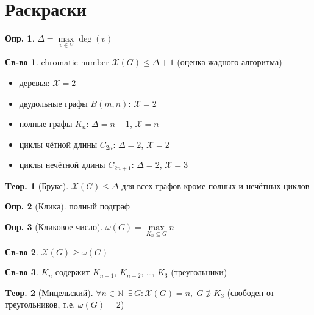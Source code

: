 \documentclass[a4paper,12pt]{article}
\theoremstyle{definition}
\newtheorem{definition}{Опр.}[section]
\newtheorem*{property}{Св-во}  %
\theoremstyle{definition}
\newtheorem{theorem}{Tеор.}[section]
\def\iiChi{\mathcal{X}}
\begin{document}
\section{Раскраски}

\begin{definition} $\Delta = \max \limits_{v \in V} \deg(v)$ \end{definition}

\begin{property}
	chromatic number $\iiChi(G) \leqslant \Delta + 1$ (оценка жадного алгоритма)
\end{property}

\begin{itemize}
  \item  деревья:  $\iiChi=2$
  \item  двудольные графы $B(m,n)$: $\iiChi=2$
  \item  полные графы $K_n$:        $\Delta=n-1$, $\iiChi=n$
  \item  циклы чётной длины $C_{2n}$:     $\Delta=2$, $\iiChi=2$
  \item  циклы нечётной длины $C_{2n+1}$: $\Delta=2$, $\iiChi=3$
\end{itemize}

\begin{theorem}[Брукс]
	$\iiChi(G) \leqslant \Delta$ для всех графов кроме полных и нечётных циклов
\end{theorem}

\begin{definition}[Клика] полный подграф \end{definition}

\begin{definition}[Кликовое число]
	$ \omega(G) = \max \limits_{K_n \subseteq G} n $
\end{definition}

\begin{property} $ \iiChi(G) \geqslant \omega(G) $ \end{property}

\begin{property} $K_n$ содержит $K_{n-1}$, $K_{n-2}$, \dots, $K_3$ (треугольники) \end{property}

\begin{theorem}[Мицельский]
	$\forall n \in \mathbb{N} \;\; \exists \, G: \iiChi(G)=n, \; G \not\owns K_3$
	(свободен от треугольников, т.е. $\omega(G)=2$)
\end{theorem}
\end{document}
